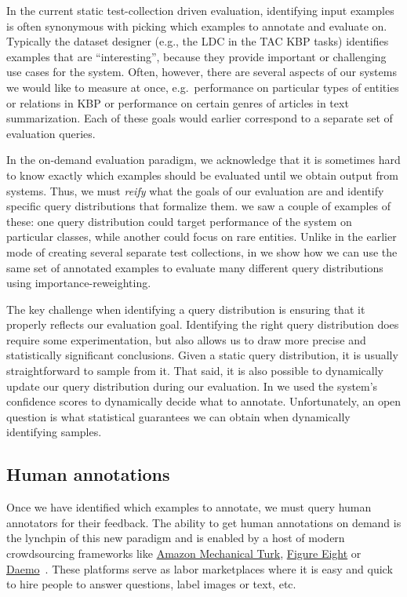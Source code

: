 In the current static test-collection driven evaluation, identifying input examples is often synonymous with picking which examples to annotate and evaluate on.
Typically the dataset designer (e.g., the LDC in the TAC KBP tasks) identifies examples that are ``interesting'', because they provide important or challenging use cases for the system.
Often, however, there are several aspects of our systems we would like to measure at once, e.g.\ performance on particular types of entities or relations in KBP or performance on certain genres of articles in text summarization.
Each of these goals would earlier correspond to a separate set of evaluation queries. 

In the on-demand evaluation paradigm, 
  we acknowledge that it is sometimes hard to know exactly which examples should be evaluated until we obtain output from systems.
Thus, we must \textit{reify} what the goals of our evaluation are and identify specific query distributions that formalize them.
 we saw a couple of examples of these: one query distribution could target performance of the system on particular classes, while another could focus on rare entities.
Unlike in the earlier mode of creating several separate test collections, in  we show how we can use the same set of annotated examples to evaluate many different query distributions using importance-reweighting.

The key challenge when identifying a query distribution is ensuring that it properly reflects our evaluation goal.
Identifying the right query distribution does require some experimentation, but also allows us to draw more precise and statistically significant conclusions.
Given a static query distribution, it is usually straightforward to sample from it.
That said, it is also possible to dynamically update our query distribution during our evaluation.
In  we used the system's confidence scores to dynamically decide what to annotate.
Unfortunately, an open question is what statistical guarantees we can obtain when dynamically identifying samples.

\subsection{Human annotations}
Once we have identified which examples to annotate, we must query human annotators for their feedback.
The ability to get human annotations on demand is the lynchpin of this new paradigm and is enabled by a host of modern crowdsourcing frameworks like \href{requester.mturk.com}{Amazon Mechanical Turk}, \href{https://www.figure-eight.com/}{Figure Eight} or \href{https://daemo.org}{Daemo}~\cite{gaikwad2015daemo}.
These platforms serve as labor marketplaces where it is easy and quick to hire people to answer questions, label images or text, etc.

